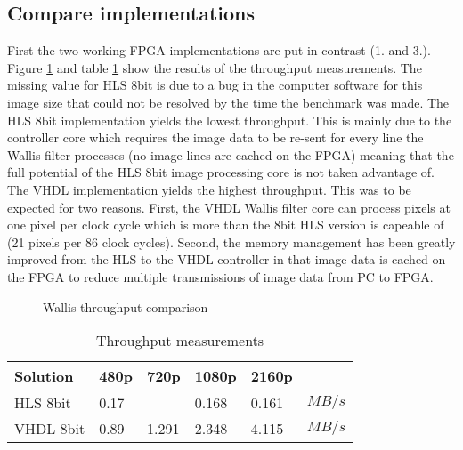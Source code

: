 \subsection{Compare implementations}
First the two working FPGA implementations are put in contrast (1. and 3.).
Figure \ref{fig:benchmarkcompare} and table \ref{tab:throughputmeasuremetns}
show the results of the throughput measurements. The missing value for HLS 8bit
is due to a bug in the computer software for this image size that could not be
resolved by the time the benchmark was made. The HLS 8bit implementation yields
the lowest throughput. This is mainly due to the controller core which requires
the image data to be re-sent for every line the Wallis filter processes 
(no
image lines are cached on the FPGA) meaning
that the full potential of the HLS 8bit image processing core is not taken
advantage of. The VHDL implementation yields the
highest
throughput. This was to be expected for two
reasons. First, the VHDL Wallis filter core can process pixels at one pixel per
clock cycle which is more than the 8bit HLS version is capeable of (21 pixels
per 86 clock cycles).
Second, the memory management has been greatly improved from the HLS to the VHDL
controller in that image data is cached on the FPGA to reduce multiple
transmissions of image data from PC to FPGA. 

\begin{figure}[tb!]
    \centering
    \begin{adjustbox}{max width=\linewidth}
        
    \end{adjustbox}
    \caption{Wallis throughput comparison}
    \label{fig:benchmarkcompare}
\end{figure}

\begin{table}[tb!]
    \centering
    \begin{tabular}{l l l l l l}
        \toprule
        Solution & 480p & 720p & 1080p & 2160p & \\
        \midrule
        HLS 8bit   & 0.17  &       & 0.168 & 0.161 & $MB/s$ \\
        VHDL 8bit      & 0.89  & 1.291 & 2.348 & 4.115 & $MB/s$\\
        \bottomrule
    \end{tabular}
    \caption{Throughput measurements}
    \label{tab:throughputmeasuremetns}
\end{table}


